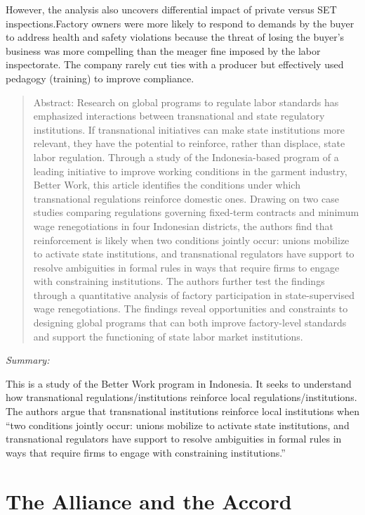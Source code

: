 \documentclass[
  12pt,
]{article}
\begin{document}
However, the analysis also uncovers differential impact of private
versus SET inspections.Factory owners were more likely to respond to
demands by the buyer to address health and safety violations because the
threat of losing the buyer's business was more compelling than the
meager fine imposed by the labor inspectorate. The company rarely cut
ties with a producer but effectively used pedagogy (training) to improve
compliance.

\bigbreak
{}
\begin{quote}
Abstract: 
Research on global programs to regulate labor standards has emphasized interactions between transnational and state regulatory institutions. If transnational initiatives can make state institutions more relevant, they have the potential to reinforce, rather than displace, state labor regulation. Through a study of the Indonesia-based program of a leading initiative to improve working conditions in the garment industry, Better Work, this article identifies the conditions under which transnational regulations reinforce domestic ones. Drawing on two case studies comparing regulations governing fixed-term contracts and minimum wage renegotiations in four Indonesian districts, the authors find that reinforcement is likely when two conditions jointly occur: unions mobilize to activate state institutions, and transnational regulators have support to resolve ambiguities in formal rules in ways that require firms to engage with constraining institutions. The authors further test the findings through a quantitative analysis of factory participation in state-supervised wage renegotiations. The findings reveal opportunities and constraints to designing global programs that can both improve factory-level standards and support the functioning of state labor market institutions.
\end{quote}

\emph{Summary:}

This is a study of the Better Work program in Indonesia. It seeks to
understand how transnational regulations/institutions reinforce local
regulations/institutions. The authors argue that transnational
institutions reinforce local institutions when ``two conditions jointly
occur: unions mobilize to activate state institutions, and transnational
regulators have support to resolve ambiguities in formal rules in ways
that require firms to engage with constraining institutions.''

\hypertarget{the-alliance-and-the-accord}{%
\section{The Alliance and the
Accord}\label{the-alliance-and-the-accord}}
\end{document}

